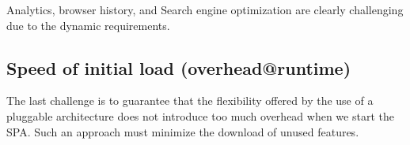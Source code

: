 Analytics, browser history, and Search engine optimization are clearly challenging due to the dynamic requirements.

\subsection{Speed of initial load (overhead{@}runtime) }
The last challenge is to guarantee that the flexibility offered by the use of a pluggable architecture does not introduce too much overhead when we start the SPA. Such an approach must minimize the download of unused features.

